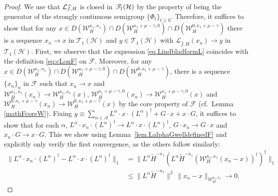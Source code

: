 \documentclass[11pt]{amsart}
\newcommand{\1}{\mathbbm{1}}
\theoremstyle{plain}
\theoremstyle{definition}
\theoremstyle{remark}
\numberwithin{equation}{section}
\begin{document}
\begin{proof}
We use that $\mathcal{L}_{\smash{\widehat{f},H}}$ is closed in $\mathscr{T}_{\smash{1}}(\mathcal{H})$ by the property of being the generator of the strongly continuous semigroup $\{\Phi_t\}_{t\ge 0}$. Therefore, it suffices to show that for any $x\in D(\mathcal{W}_H^{\kappa_1,\kappa_1})\cap D(\mathcal{W}_H^{\kappa_1+\mu-\gamma,0})\cap D(\mathcal{W}_H^{0,\kappa_1+\mu-\gamma})$ there is a sequence $x_n\to x$ in $\mathscr{T}_1(\mathcal{H})$ and $y\in \mathscr{T}_1(\mathcal{H})$ with $\mathcal{L}_{\widehat{f},H}(x_n)\to y$ in $\mathscr{T}_1(\mathcal{H})$. First, we observe that the expression \eqref{eq.LindbladformL} coincides with the definition \eqref{eq:cLonF}
on $\mathscr{F}$. Moreover, for any $x\in D(\mathcal{W}_H^{\kappa_1,\kappa_1})\cap D(\mathcal{W}_H^{\kappa_1+\mu-\gamma,0})\cap D(\mathcal{W}_H^{0,\kappa_1+\mu-\gamma})$, 
there is a sequence $\{x_n\}_{n}$ in $\mathscr{F}$ such that $x_n\to x$ and $\mathcal{W}_H^{\kappa_1,\kappa_1}(x_n)\to \mathcal{W}_H^{\kappa_1,\kappa_1}(x),\,\mathcal{W}_H^{\kappa_1+\mu-\gamma,0}(x_n)\to \mathcal{W}_H^{\kappa_1+\mu-\gamma,0}(x) $ and $\mathcal{W}_H^{0,\kappa_1+\mu-\gamma}(x_n)\to\mathcal{W}_H^{0,\kappa_1+\mu-\gamma}(x)$ by the core property of $\mathscr{F}$ (cf.~Lemma \ref{mathFcoreW}). Fixing $y\equiv \sum_{\alpha\in\mathcal{A}}L^\alpha\cdot x \cdot (L^\alpha)^\dagger+G\cdot x+x\cdot G$, it suffices to show that for each $\alpha$, $L^\alpha\cdot x_n \cdot (L^\alpha)^\dagger\to L^\alpha\cdot x\cdot (L^\alpha)^\dagger$, $G\cdot x_n\to G\cdot x$ and $x_n\cdot G\to x\cdot G$. This we show using Lemma~\ref{lem.LalphaGwelldefinedF} and explicitly only verify the first convergence, as the others follow similarly:
\begin{align*}
\|L^\alpha\cdot x_n\cdot (L^\alpha)^\dagger- L^\alpha\cdot x\cdot (L^\alpha)^\dagger\|_1&=\|L^\alpha\widetilde{H}^{-\kappa_1}(L^\alpha\widetilde{H}^{-\kappa_1}(\mathcal{W}_H^{\kappa_1,\kappa_1}(x_n-x))^\dagger)^\dagger\|_1\\
&\le \|L^\alpha \widetilde{H}^{-\kappa_1}\|^2\,\|x_n-x\|_{\mathcal{W}_H^{\kappa_1,\kappa_1}}\to 0.
\end{align*}

\end{proof}
\end{document}

